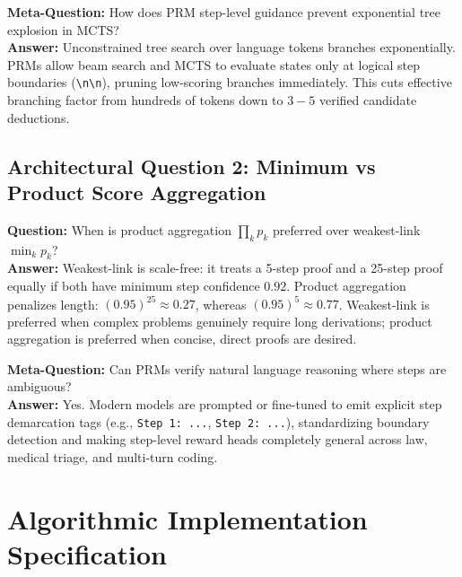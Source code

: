 \documentclass[11pt,a4paper]{article}
\theoremstyle{definition}
\begin{document}
\textbf{Meta-Question:} How does PRM step-level guidance prevent exponential tree explosion in MCTS?\\
\textbf{Answer:} Unconstrained tree search over language tokens branches exponentially. PRMs allow beam search and MCTS to evaluate states only at logical step boundaries (\texttt{\textbackslash n\textbackslash n}), pruning low-scoring branches immediately. This cuts effective branching factor from hundreds of tokens down to $3 - 5$ verified candidate deductions.

\subsection{Architectural Question 2: Minimum vs Product Score Aggregation}
\textbf{Question:} When is product aggregation $\prod_k p_k$ preferred over weakest-link $\min_k p_k$?\\
\textbf{Answer:} Weakest-link is scale-free: it treats a 5-step proof and a 25-step proof equally if both have minimum step confidence $0.92$. Product aggregation penalizes length: $(0.95)^{25} \approx 0.27$, whereas $(0.95)^5 \approx 0.77$. Weakest-link is preferred when complex problems genuinely require long derivations; product aggregation is preferred when concise, direct proofs are desired.

\textbf{Meta-Question:} Can PRMs verify natural language reasoning where steps are ambiguous?\\
\textbf{Answer:} Yes. Modern models are prompted or fine-tuned to emit explicit step demarcation tags (e.g., \texttt{Step 1: ...}, \texttt{Step 2: ...}), standardizing boundary detection and making step-level reward heads completely general across law, medical triage, and multi-turn coding.

\section{Algorithmic Implementation Specification}
\end{document}
